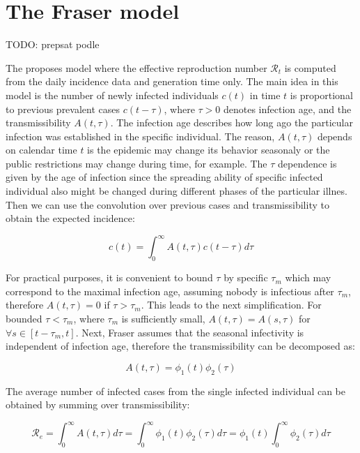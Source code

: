 \documentclass[
  digital, %
  oneside, %
  lof,     %
  lot,     %
]{fithesis4}
\begin{document}
\section{The Fraser model}

TODO: prepsat podle \cite{ma2019}

The \cite{fraser2007} proposes model where the effective 
reproduction number $\mathcal{R}_t$ is computed from the 
daily incidence data and generation time only.
The main idea in this model is the number of newly infected 
individuals $c(t)$ in time $t$ is proportional to 
previous prevalent cases $c(t - \tau)$, where 
$\tau > 0$ denotes infection age, and the transmissibility 
$A(t, \tau)$. The infection age describes how long ago 
the particular infection was established in the specific 
individual.
The reason, $A(t, \tau)$ depends on calendar time $t$ is 
the epidemic may change its behavior seasonaly or the 
public restrictions may change during time, for example.
The $\tau$ dependence is given by the age of infection 
since the spreading ability of specific infected individual 
also might be changed during different phases of the 
particular illnes.
Then we can use the convolution over previous cases 
and transmissibility to obtain the expected incidence:

\begin{equation}
c( t ) = \int^{\infty}_0 A ( t, \tau ) c ( t - \tau ) d\tau
\end{equation}

For practical purposes, it is convenient to bound $\tau$ 
by specific $\tau_m$ which may correspond to the maximal 
infection age, assuming nobody is infectious after 
$\tau_m$, therefore $A(t, \tau) = 0$ if $\tau > \tau_m$.
This leads to the next simplification.
For bounded $\tau < \tau_m$, where $\tau_m$ is 
sufficiently small, $A(t, \tau) = A(s, \tau)$ for 
$\forall s \in \left[ t - \tau_m, t \right]$.
Next, Fraser assumes that the seasonal infectivity is 
independent of infection age, therefore the transmissibility 
can be decomposed as:

\begin{equation}
A(t, \tau) = \phi_1(t) \phi_2(\tau)
\end{equation}

The average number of infected cases from the single infected 
individual can be obtained by summing over transmissibility:

\begin{equation}
\mathcal{R}_e = \int^{\infty}_0 A(t, \tau) d\tau = \int^{\infty}_0 \phi_1(t) \phi_2(\tau) d\tau = \phi_1(t) \int^{\infty}_0 \phi_2(\tau) d\tau
\end{equation}
\end{document}
